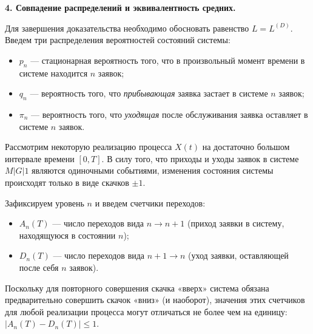 \begin{tproof}
\textbf{4. Совпадение распределений и эквивалентность средних.}

Для завершения доказательства необходимо обосновать равенство $L = L^{(D)}$. Введем три распределения вероятностей состояний системы:
\begin{itemize}
    \item $p_n$ — стационарная вероятность того, что в произвольный момент времени в системе находится $n$ заявок;
    \item $q_n$ — вероятность того, что \textit{прибывающая} заявка застает в системе $n$ заявок;
    \item $\pi_n$ — вероятность того, что \textit{уходящая} после обслуживания заявка оставляет в системе $n$ заявок.
\end{itemize}

Рассмотрим некоторую реализацию процесса $X(t)$ на достаточно большом интервале времени $[0, T]$. В силу того, что приходы и уходы заявок в системе $M|G|1$ являются одиночными событиями, изменения состояния системы происходят только в виде скачков $\pm 1$. 

Зафиксируем уровень $n$ и введем счетчики переходов:
\begin{itemize}
    \item $A_n(T)$ — число переходов вида $n \to n+1$ (приход заявки в систему, находящуюся в состоянии $n$);
    \item $D_n(T)$ — число переходов вида $n+1 \to n$ (уход заявки, оставляющей после себя $n$ заявок).
\end{itemize}

Поскольку для повторного совершения скачка «вверх» система обязана предварительно совершить скачок «вниз» (и наоборот), значения этих счетчиков для любой реализации процесса могут отличаться не более чем на единицу: $|A_n(T) - D_n(T)| \le 1$.

\begin{center}
\end{center}
\end{tproof}
